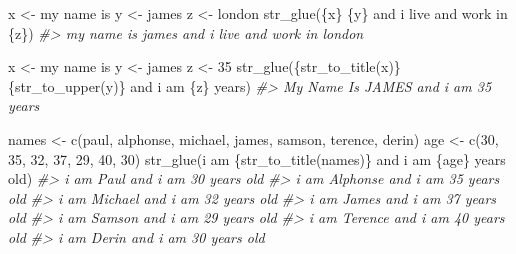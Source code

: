 \documentclass[
]{book}
\newenvironment{Shaded}{\begin{snugshade}}{\end{snugshade}}
\newcommand{\CommentTok}[1]{\textcolor[rgb]{0.56,0.35,0.01}{\textit{#1}}}
\newcommand{\DecValTok}[1]{\textcolor[rgb]{0.00,0.00,0.81}{#1}}
\newcommand{\FunctionTok}[1]{\textcolor[rgb]{0.00,0.00,0.00}{#1}}
\newcommand{\NormalTok}[1]{#1}
\newcommand{\OtherTok}[1]{\textcolor[rgb]{0.56,0.35,0.01}{#1}}
\newcommand{\StringTok}[1]{\textcolor[rgb]{0.31,0.60,0.02}{#1}}
\begin{document}
\begin{Shaded}
\begin{Highlighting}[]
\NormalTok{x }\OtherTok{\textless{}{-}} \StringTok{\textquotesingle{}my name is\textquotesingle{}}
\NormalTok{y }\OtherTok{\textless{}{-}} \StringTok{\textquotesingle{}james\textquotesingle{}}
\NormalTok{z }\OtherTok{\textless{}{-}} \StringTok{\textquotesingle{}london\textquotesingle{}}
\FunctionTok{str\_glue}\NormalTok{(}\StringTok{\textquotesingle{}\{x\} \{y\} and i live and work in \{z\}\textquotesingle{}}\NormalTok{)}
\CommentTok{\#\textgreater{} my name is james and i live and work in london}


\NormalTok{x }\OtherTok{\textless{}{-}} \StringTok{\textquotesingle{}my name is\textquotesingle{}}
\NormalTok{y }\OtherTok{\textless{}{-}} \StringTok{\textquotesingle{}james\textquotesingle{}}
\NormalTok{z }\OtherTok{\textless{}{-}} \DecValTok{35}
\FunctionTok{str\_glue}\NormalTok{(}\StringTok{\textquotesingle{}\{str\_to\_title(x)\} \{str\_to\_upper(y)\} and i am \{z\} years\textquotesingle{}}\NormalTok{)}
\CommentTok{\#\textgreater{} My Name Is JAMES and i am 35 years}

\NormalTok{names }\OtherTok{\textless{}{-}} \FunctionTok{c}\NormalTok{(}\StringTok{\textquotesingle{}paul\textquotesingle{}}\NormalTok{, }\StringTok{\textquotesingle{}alphonse\textquotesingle{}}\NormalTok{, }\StringTok{\textquotesingle{}michael\textquotesingle{}}\NormalTok{, }\StringTok{\textquotesingle{}james\textquotesingle{}}\NormalTok{, }\StringTok{\textquotesingle{}samson\textquotesingle{}}\NormalTok{, }\StringTok{\textquotesingle{}terence\textquotesingle{}}\NormalTok{, }\StringTok{\textquotesingle{}derin\textquotesingle{}}\NormalTok{)}
\NormalTok{age }\OtherTok{\textless{}{-}} \FunctionTok{c}\NormalTok{(}\DecValTok{30}\NormalTok{, }\DecValTok{35}\NormalTok{, }\DecValTok{32}\NormalTok{, }\DecValTok{37}\NormalTok{, }\DecValTok{29}\NormalTok{, }\DecValTok{40}\NormalTok{, }\DecValTok{30}\NormalTok{)}
\FunctionTok{str\_glue}\NormalTok{(}\StringTok{\textquotesingle{}i am \{str\_to\_title(names)\} and i am \{age\} years old\textquotesingle{}}\NormalTok{)}
\CommentTok{\#\textgreater{} i am Paul and i am 30 years old}
\CommentTok{\#\textgreater{} i am Alphonse and i am 35 years old}
\CommentTok{\#\textgreater{} i am Michael and i am 32 years old}
\CommentTok{\#\textgreater{} i am James and i am 37 years old}
\CommentTok{\#\textgreater{} i am Samson and i am 29 years old}
\CommentTok{\#\textgreater{} i am Terence and i am 40 years old}
\CommentTok{\#\textgreater{} i am Derin and i am 30 years old}
\end{Highlighting}
\end{Shaded}
\end{document}
